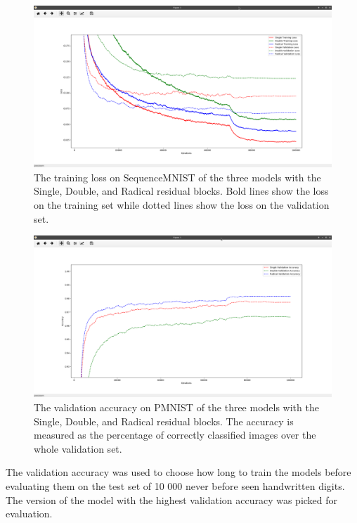 \documentclass[a4paper, twoside]{article}
\begin{document}
\begin{figure}
\begin{center}
    \includegraphics[width=15cm]{pmnistloss.png}\caption{The training loss on SequenceMNIST of the three models with the Single, Double, and Radical residual blocks. Bold lines show the loss on the training set while dotted lines show the loss on the validation set.}\label{figpmnistloss}
\end{center}
\end{figure}
\begin{figure}
\begin{center}
    \includegraphics[width=15cm]{pmnistacc.png}\caption{The validation accuracy on PMNIST of the three models with the Single, Double, and Radical residual blocks. The accuracy is measured as the percentage of correctly classified images over the whole validation set.}\label{figpmnistacc}
\end{center}
\end{figure}

The validation accuracy was used to choose how long to train the models before evaluating them on the test set of 10 000 never before seen handwritten digits. The version of the model with the highest validation accuracy was picked for evaluation.
\end{document}
